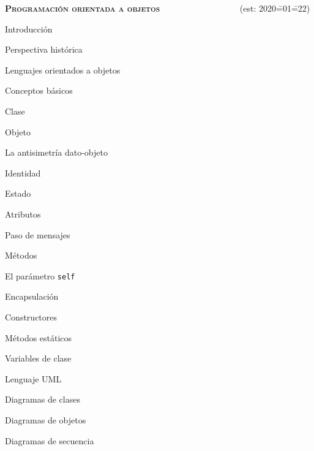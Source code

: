 \begin{longenum}
\begin{longenum}
\begin{longenum}
        \end{longenum}
    \end{longenum}
    \item \textbf{\textsc{Programación orientada a objetos}} \ \ \ \ \ \ \ \ \ \ \ \ \ \ \ \ \ \ (est: 2020\==01\==22)
    \begin{longenum}
        \item Introducción
        \begin{longenum}
            \item Perspectiva histórica
            \item Lenguajes orientados a objetos
        \end{longenum}
        \item Conceptos básicos
        \begin{longenum}
            \item Clase
            \item Objeto
            \begin{longenum}
                \item La antisimetría dato-objeto
            \end{longenum}
            \item Identidad
            \item Estado
            \item Atributos
            \item Paso de mensajes
            \item Métodos
            \begin{longenum}
                \item El parámetro \texttt{self}
            \end{longenum}
            \item Encapsulación
            \item Constructores
            \item Métodos estáticos
            \item Variables de clase
        \end{longenum}
        \item Lenguaje UML
        \begin{longenum}
            \item Diagramas de clases
            \item Diagramas de objetos
            \item Diagramas de secuencia

\end{longenum}
\end{longenum}
\end{longenum}
